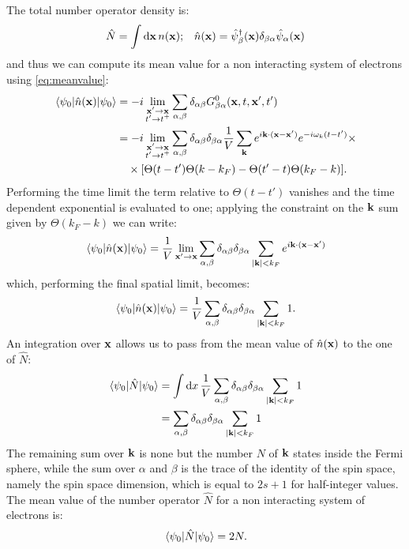 \documentclass[a4paper]{article}
\begin{document}
The total number operator density is:
\begin{align}
&\hat{N} = \int \dd{\vb{x}} n(\vb{x}); &\hat{n}(\vb{x}) = \hat{\psi}^\dag_\beta(\vb{x}) \delta_{\beta\alpha}\hat{\psi}_\alpha(\vb{x})
\end{align}
and thus we can compute its mean value for a non interacting system of electrons using \eqref{eq:meanvalue}:
\begin{align}
\mel{\psi_0}{\hat{n}(\vb{x})}{\psi_0} &= - i \lim_{\substack{\vb{x}'\rightarrow \vb{x}\\t'\rightarrow t^+}} \sum_{\alpha,\beta} \delta_{\alpha\beta} G^0_{\beta\alpha}(\vb{x},t,\vb{x}',t')\\
&=- i \lim_{\substack{\vb{x}'\rightarrow \vb{x}\\t'\rightarrow t^+}} \sum_{\alpha,\beta} \delta_{\alpha\beta}\delta_{\beta\alpha} \frac{1}{V} \sum_{\vb{k}}e^{i\vb{k}\cdot(\vb{x} - \vb{x'})}e^{-i\omega_k (t-t')} \times\\
&\quad\times\bqty{\Theta(t-t')\Theta(k-k_F) - \Theta(t'-t)\Theta(k_F - k)}.
\end{align}
Performing the time limit the term relative to $\Theta(t-t')$ vanishes and the time dependent exponential is evaluated to one; applying the constraint on the $\vb{k}$ sum given by $\Theta(k_F - k)$ we can write:
\begin{equation}
\mel{\psi_0}{\hat{n}(\vb{x})}{\psi_0} = \frac{1}{V} \lim_{\vb{x}'\rightarrow \vb{x}} \sum_{\alpha,\beta} \delta_{\alpha\beta}\delta_{\beta\alpha} \sum_{\abs{\vb{k}}< k_F} e^{i\vb{k}\cdot(\vb{x} - \vb{x'})}
\end{equation}
which, performing the final spatial limit, becomes:
\begin{equation}
\mel{\psi_0}{\hat{n}(\vb{x})}{\psi_0} = \frac{1}{V} \sum_{\alpha,\beta} \delta_{\alpha\beta}\delta_{\beta\alpha} \sum_{\abs{\vb{k}}< k_F} 1.
\end{equation}
An integration over $\vb{x}$ allows us to pass from the mean value of $\hat{n}(\vb{x})$ to the one of $\hat{N}:$
\begin{align}
\mel{\psi_0}{\hat{N}}{\psi_0} &= \int \dd{x}\frac{1}{V} \sum_{\alpha,\beta} \delta_{\alpha\beta}\delta_{\beta\alpha} \sum_{\abs{\vb{k}}< k_F} 1\\
&= \sum_{\alpha,\beta} \delta_{\alpha\beta}\delta_{\beta\alpha} \sum_{\abs{\vb{k}}< k_F} 1
\end{align}
The remaining sum over $\vb{k}$ is none but the number $N$ of $\vb{k}$ states inside the Fermi sphere, while the sum over $\alpha$ and $\beta$ is the trace of the identity of the spin space, namely the spin space dimension, which is equal to $2s+1$ for half-integer values.
The mean value of the number operator $\hat{N}$ for a non interacting system of electrons is:
\begin{equation}
\mel{\psi_0}{\hat{N}}{\psi_0} = 2N.
\end{equation}
\end{document}
